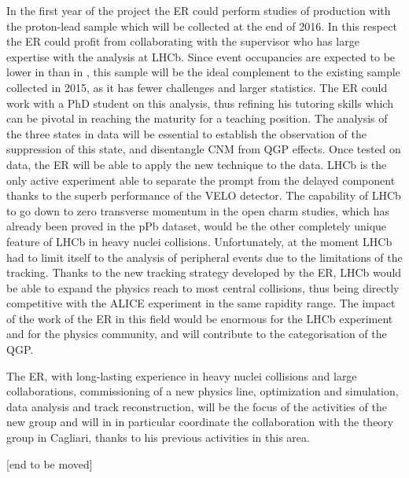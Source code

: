 \documentclass[a4paper,11pt]{article}
\begin{document}
In the first year of the project the ER could perform studies of \PgU production with the proton-lead sample which will be collected at the end of 2016. In this respect the ER could profit from collaborating with the supervisor who has large expertise with the \PgU analysis at LHCb. Since event occupancies are expected to be lower in \pPb than in \PbPb, this sample will be the ideal complement to the existing \PbPb sample collected in 2015, as it has fewer challenges and larger statistics. The ER could work with a PhD student on this analysis, thus refining his tutoring skills which can be pivotal in reaching the maturity for a teaching position.
The analysis of the three \PgUn
states in \pPb data will 
be essential to establish the observation of 
the suppression of this state, and disentangle CNM from QGP effects.
Once tested on \pPb data, the ER will be able to 
apply the new technique to the \PbPb data.
LHCb is the 
only active experiment able to separate 
the prompt from the delayed component thanks 
to the superb performance of the VELO
detector. The capability of LHCb to go 
down to zero transverse momentum in the 
open charm studies, which has already been 
proved in the pPb dataset, would be the other 
completely unique feature of LHCb in
heavy nuclei collisions. Unfortunately, at the 
moment LHCb had to limit itself to the 
analysis of peripheral events due to the 
limitations of the tracking. Thanks to the new 
tracking strategy developed by the ER, 
LHCb would be able to 
expand the physics reach to most central 
collisions, thus being directly competitive 
with the ALICE experiment in the same 
rapidity range. The impact of the work of
the ER in this field would be enormous
for the LHCb experiment and for the  
physics community, and will contribute to 
the categorisation of the QGP.


The ER, with long-lasting experience in heavy nuclei
collisions and large collaborations, commissioning
of a new physics line, optimization and simulation, data analysis and track
reconstruction, will be the focus of the activities
of the new group and will in
in particular coordinate the 
collaboration with the 
theory group in Cagliari, thanks to his previous 
activities in this area.

[end to be moved] %
\end{document}
